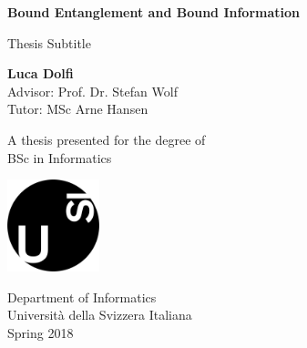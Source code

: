 \begin{titlepage}
    \begin{center}
        \vspace*{1cm}
        
        \Huge
        \textbf{Bound Entanglement and Bound Information}
        
        \vspace{0.5cm}
        \LARGE
        Thesis Subtitle
        
        \vspace{1.5cm}
        
        \textbf{Luca Dolfi}\\ 
         Advisor: Prof. Dr. Stefan Wolf \\ 
         Tutor: MSc Arne Hansen \\
        
        \vfill
        
        A thesis presented for the degree of\\
        BSc in Informatics
        
        \vspace{0.8cm}
        
        \includegraphics[width=0.2\textwidth]{images/usi-immagini-logo-formatted.png}
        
        \Large
        Department of Informatics\\
        Universit\`a della Svizzera Italiana\\
        Spring 2018
        
    \end{center}
\end{titlepage}